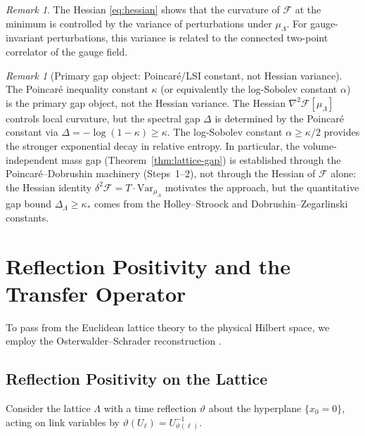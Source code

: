 \documentclass[12pt,a4paper]{article}
\theoremstyle{definition}
\theoremstyle{plain}
\theoremstyle{remark}
\newtheorem{remark}[definition]{Remark}
\begin{document}
\begin{remark}
The Hessian \eqref{eq:hessian} shows that the curvature of $\mathcal{F}$ at the minimum is controlled by the variance of perturbations under $\mu_\Lambda$. For gauge-invariant perturbations, this variance is related to the connected two-point correlator of the gauge field.
\end{remark}

\begin{remark}[Primary gap object: Poincar\'e/LSI constant, not Hessian variance]
\label{rem:primary-gap-object}
The Poincar\'e inequality constant $\kappa$ (or equivalently the log-Sobolev constant $\alpha$) is the primary gap object, not the Hessian variance. The Hessian $\nabla^2 \mathcal{F}[\mu_\Lambda]$ controls local curvature, but the spectral gap $\Delta$ is determined by the Poincar\'e constant via $\Delta = -\log(1-\kappa) \geq \kappa$. The log-Sobolev constant $\alpha \geq \kappa/2$ provides the stronger exponential decay in relative entropy. In particular, the volume-independent mass gap (Theorem~\ref{thm:lattice-gap}) is established through the Poincar\'e--Dobrushin machinery (Steps~1--2), not through the Hessian of $\mathcal{F}$ alone: the Hessian identity $\delta^2 \mathcal{F} = T \cdot \mathrm{Var}_{\mu_\Lambda}$ motivates the approach, but the quantitative gap bound $\Delta_\Lambda \geq \kappa_*$ comes from the Holley--Stroock and Dobrushin--Zegarlinski constants.
\end{remark}

\section{Reflection Positivity and the Transfer Operator}

To pass from the Euclidean lattice theory to the physical Hilbert space, we employ the Osterwalder--Schrader reconstruction \cite{OsterwalderSchrader1973, OsterwalderSchrader1975}.

\subsection{Reflection Positivity on the Lattice}

Consider the lattice $\Lambda$ with a time reflection $\vartheta$ about the hyperplane $\{x_0 = 0\}$, acting on link variables by $\vartheta(U_\ell) = U_{\vartheta(\ell)}^{-1}$.
\end{document}
